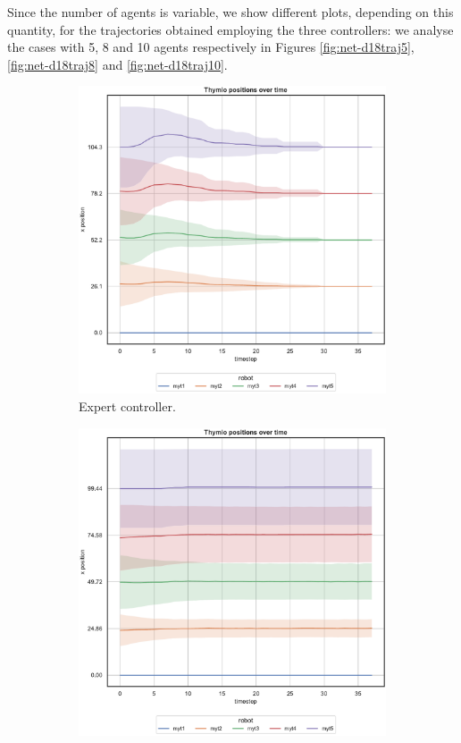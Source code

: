 Since the number of agents is variable, we show different plots, depending on this 
quantity, for the trajectories obtained employing the three controllers: we analyse 
the cases with 5, 8 and 10 agents respectively in Figures \ref{fig:net-d18traj5}, 
\ref{fig:net-d18traj8} and \ref{fig:net-d18traj10}. 
\begin{figure}[!htb]
	\begin{center}
		\begin{subfigure}[h]{0.325\textwidth}
			\centering
			\includegraphics[width=\textwidth]{contents/images/net-d18/N5/position-overtime-omniscient}%
			\caption{Expert controller.}
		\end{subfigure}
		\hfill
		\begin{subfigure}[h]{0.325\textwidth}
			\centering
			\includegraphics[width=\textwidth]{contents/images/net-d18/N5/position-overtime-manual}%

\end{subfigure}
\end{center}
\end{figure}
